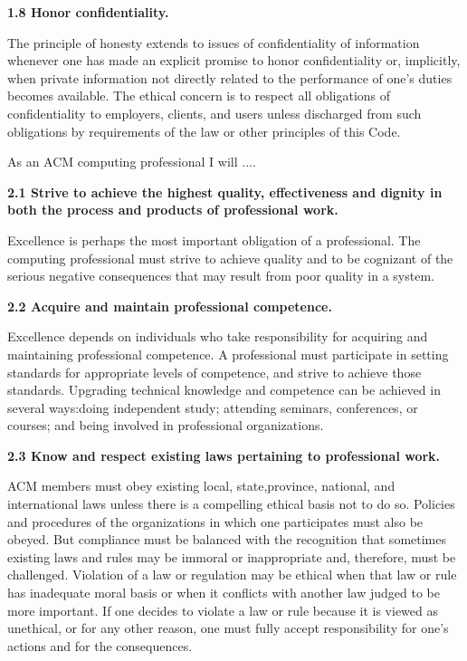 \vspace{.1in}\noindent\textbf{1.8 Honor confidentiality.}

The principle of honesty extends to issues of confidentiality of information whenever one has made an explicit promise to honor confidentiality or, implicitly, when private information not directly related to the performance of one's duties becomes available. The ethical concern is to respect all obligations of confidentiality to employers, clients, and users unless discharged from such obligations by requirements of the law or other principles of this Code.




\vspace{.2in}\vspace{.1in}

As an ACM computing professional I will ....

\vspace{.1in}\noindent\textbf{2.1 Strive to achieve the highest quality, effectiveness and dignity in both the process and products of professional work.}

Excellence is perhaps the most important obligation of a professional. The computing professional must strive to achieve quality and to be cognizant of the serious negative consequences that may result from poor quality in a system.

\vspace{.1in}\noindent\textbf{2.2 Acquire and maintain professional competence.}

Excellence depends on individuals who take responsibility for acquiring and maintaining professional competence. A professional must participate in setting standards for appropriate levels of competence, and strive to achieve those standards. Upgrading technical knowledge and competence can be achieved in several ways:doing independent study; attending seminars, conferences, or courses; and being involved in professional organizations.

\vspace{.1in}\noindent\textbf{2.3 Know and respect existing laws pertaining to professional work.}

ACM members must obey existing local, state,province, national, and international laws unless there is a compelling ethical basis not to do so. Policies and procedures of the organizations in which one participates must also be obeyed. But compliance must be balanced with the recognition that sometimes existing laws and rules may be immoral or inappropriate and, therefore, must be challenged. Violation of a law or regulation may be ethical when that law or rule has inadequate moral basis or when it conflicts with another law judged to be more important. If one decides to violate a law or rule because it is viewed as unethical, or for any other reason, one must fully accept responsibility for one's actions and for the consequences.

